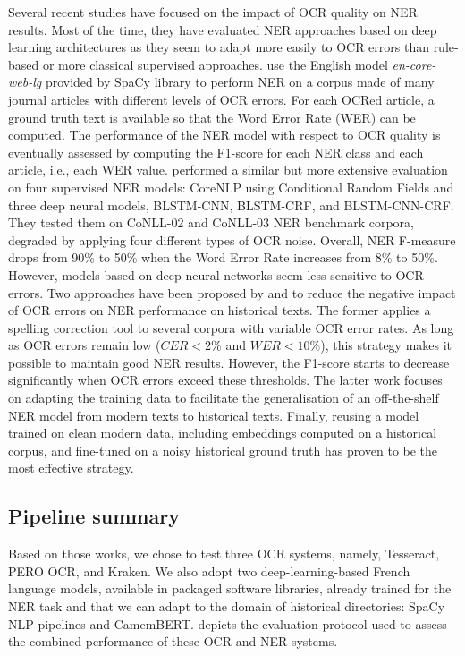 Several recent studies have focused on the impact of OCR quality on NER results. Most of the time, they have evaluated NER approaches based on deep learning architectures as they seem to adapt more easily to OCR errors than rule-based or more classical supervised approaches.
\cite{van2020assessing} use the English model \textit{en-core-web-lg} provided by SpaCy \cite{spacy} library to perform NER on a corpus made of many journal articles with different levels of OCR errors.
For each OCRed article, a ground truth text is available so that the Word Error Rate (WER) can be computed.
The performance of the NER model with respect to OCR quality is eventually assessed by computing the F1-score for each NER class and each article, i.e., each WER value.
\cite{hamdi2020assessing} performed a similar but more extensive evaluation on four supervised NER models: CoreNLP using Conditional Random Fields and three deep neural models, BLSTM-CNN, BLSTM-CRF, and BLSTM-CNN-CRF.
They tested them on CoNLL-02 and CoNLL-03 NER benchmark corpora, degraded by applying four different types of OCR noise. Overall, NER F-measure drops from 90\% to 50\% when the Word Error Rate increases from 8\% to 50\%. However, models based on deep neural networks seem less sensitive to OCR errors. 
Two approaches have been proposed by \cite{huynh2020use} and \cite{marz2021data}  to reduce the negative impact of OCR errors on NER performance on historical texts.
The former applies a spelling correction tool to several corpora with variable OCR error rates. 
As long as OCR errors remain low ($CER<2\%$ and $WER<10\%$), this strategy makes it possible to maintain good NER results. However, the F1-score starts to decrease significantly when OCR errors exceed these thresholds.
The latter work focuses on adapting the training data to facilitate the generalisation of an off-the-shelf NER model from modern texts to historical texts.
Finally, reusing a model trained on clean modern data, including embeddings computed on a historical corpus, and fine-tuned on a noisy historical ground truth has proven to be the most effective strategy.

\subsection{Pipeline summary}
\label{sec:pipeline-summary}

Based on those works, we chose to test three OCR systems, namely, Tesseract, PERO OCR, and Kraken. We also adopt two deep-learning-based French language models, available in packaged software libraries, already trained for the NER task and that we can adapt to the domain of historical directories: SpaCy NLP pipelines and CamemBERT.
 depicts the evaluation protocol used to assess the combined performance of these OCR and NER systems. 

